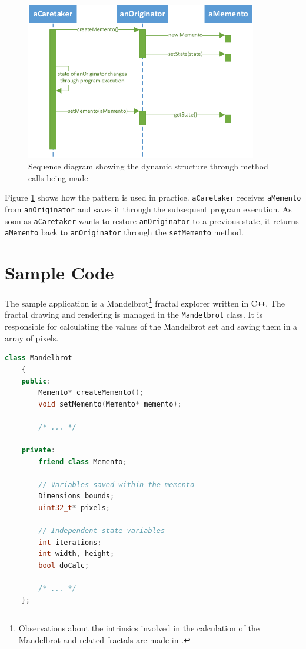 \documentclass[11pt, a4paper, twoside]{article}
\def\cpp{C{}\texttt{++}}
\begin{document}
	\begin{figure}[htb]
		\begin{center}
			\includegraphics[width=0.9\textwidth]{sequence_diagram.pdf}
			\caption{Sequence diagram showing the dynamic structure through method calls being made}
			\label{fig:sequence}
		\end{center}
	\end{figure}
	
	Figure \ref{fig:sequence} shows how the pattern is used in practice. \verb|aCaretaker| receives \verb|aMemento| from \verb|anOriginator| and saves it through the subsequent program execution. As soon as \verb|aCaretaker| wants to restore \verb|anOriginator| to a previous state, it returns \verb|aMemento| back to \verb|anOriginator| through the \verb|setMemento| method.
	
	
	\section{Sample Code}
	The sample application is a Mandelbrot\footnote{Observations about the intrinsics involved in the calculation of the Mandelbrot and related fractals are made in \cite{mandelbrot1980fractal}.} fractal explorer written in \cpp. The fractal drawing and rendering is managed in the \verb|Mandelbrot| class. It is responsible for calculating the values of the Mandelbrot set and saving them in a array of pixels.
	
	\begin{lstlisting}[language=c++, caption={Mandelbrot.h}]
	class Mandelbrot
	{
	public:
		Memento* createMemento();
		void setMemento(Memento* memento);
		
		/* ... */
		
	private:
		friend class Memento;
		
		// Variables saved within the memento
		Dimensions bounds;
		uint32_t* pixels;
		
		// Independent state variables
		int iterations;
		int width, height;
		bool doCalc;
		
		/* ... */
	};
	\end{lstlisting}
	
\end{document}

